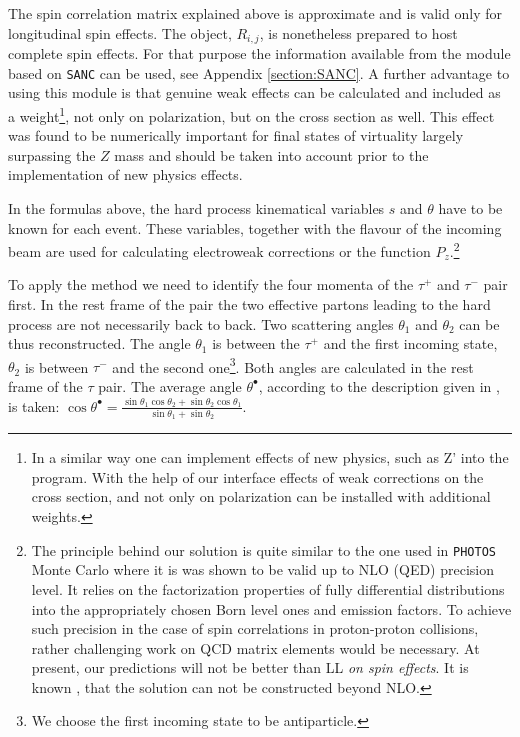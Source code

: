 \documentclass[]{Tauola_interface_design}
\begin{document}
The spin correlation matrix explained above is approximate and is valid only for 
longitudinal spin effects. The object, $R_{i,j}$, is nonetheless prepared to 
host complete spin effects. For that purpose the information available  from the module based on {\tt SANC} 
can be used, see Appendix \ref{section:SANC}.
A further advantage to using this module is that  genuine weak effects can be calculated and 
included as a weight\footnote{In a similar way one can implement effects of new physics, 
such as Z'
into the program. With the help of our interface effects of weak corrections 
on the cross section, and not only on polarization can be installed with additional 
 weights.},  not only on polarization, but on the cross section as well.
This effect was found to be numerically important \cite{Adam:2008pc,Adam:2008ge} for final states
of virtuality largely surpassing the $Z$ mass and should be taken into account prior to the implementation of  new physics effects.

In the formulas above, the hard process kinematical variables  $s$ and $\theta$ have to be known
for each event. These variables, together with the flavour of the incoming beam are used for calculating 
electroweak corrections or the function $P_z$.\footnote{
 The principle behind our 
solution is quite similar  to the one used in {\tt PHOTOS} Monte Carlo
where it is was shown \cite{Golonka:2006tw} to be  valid up to NLO (QED) precision level. 
It relies on the factorization properties of fully differential distributions into the appropriately chosen
Born level ones and emission factors.
To achieve such precision in the case of spin correlations in proton-proton
collisions, rather challenging  work on QCD matrix elements would be  necessary.
At present,
our predictions will not be better than LL {\it on spin effects}. It is known \cite{Kleiss:1990jv},
that the solution can not be constructed beyond NLO.}


To apply the method we need to identify the four momenta of the $\tau^+$ and $\tau^-$ pair first. In the rest frame of the pair the two effective partons leading to the hard process are not necessarily back to back. Two scattering angles $\theta_1$ and $\theta_2$ can be thus reconstructed.  The angle $\theta_1$ is between the $\tau^+$ and the first incoming state,
$\theta_2$ is between $\tau^-$ and the second one\footnote{We choose the first incoming state to be antiparticle.
 }. Both angles are 
calculated in the rest frame of the $\tau$ pair. 
The average angle $\theta^\bullet$, according to the description given in \cite{Was:1989ce}, is taken:
$\cos\theta^\bullet=\frac{\sin\theta_1\cos\theta_2+\sin\theta_2\cos\theta_1}{\sin\theta_1+\sin\theta_2}$.
\end{document}
